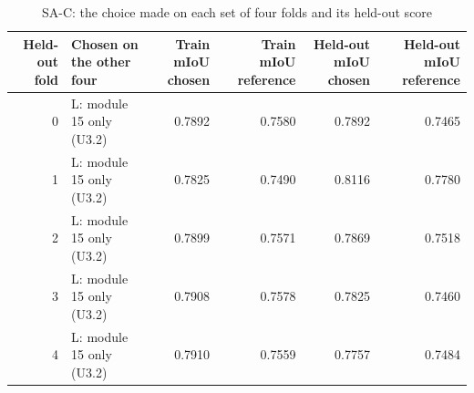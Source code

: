 \begin{table}[H]\centering\scriptsize\setlength{\tabcolsep}{3pt}
\begin{tabular}{r>{\raggedright\arraybackslash}p{1.40cm}rrrr}
\toprule
Held-out fold & Chosen on the other four & Train mIoU chosen & Train mIoU reference & Held-out mIoU chosen & Held-out mIoU reference \\
\midrule
0 & L: module 15 only (U3.2) & 0.7892 & 0.7580 & 0.7892 & 0.7465 \\
1 & L: module 15 only (U3.2) & 0.7825 & 0.7490 & 0.8116 & 0.7780 \\
2 & L: module 15 only (U3.2) & 0.7899 & 0.7571 & 0.7869 & 0.7518 \\
3 & L: module 15 only (U3.2) & 0.7908 & 0.7578 & 0.7825 & 0.7460 \\
4 & L: module 15 only (U3.2) & 0.7910 & 0.7559 & 0.7757 & 0.7484 \\
\bottomrule
\end{tabular}
\caption{SA-C: the choice made on each set of four folds and its held-out score}\label{tab:a6_sa_c_folds}
\end{table}
